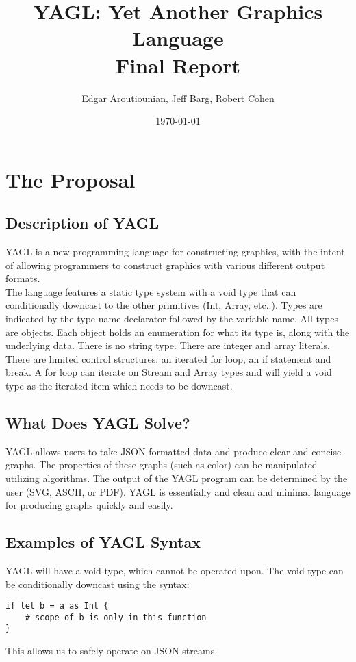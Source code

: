 \documentclass[12pt]{article}
\begin{document}
\title{YAGL: Yet Another Graphics Language\\Final Report}
\author{Edgar Aroutiounian, Jeff Barg, Robert Cohen}
\date{\today}
\maketitle


\section{The Proposal}
\subsection{Description of YAGL}
YAGL is a new programming language for constructing graphics, with the intent of allowing programmers to construct graphics with various different output formats.\\

The language features a static type system with a void type that can conditionally downcast to the other primitives (Int, Array, etc..).  Types are indicated by the type name declarator followed by the variable name.  All types are objects.  Each object holds an enumeration for what its type is, along with the underlying data.  There is no string type.  There are integer and array literals.\\

There are limited control structures: an iterated for loop, an if statement and break.  A for loop can iterate on Stream and Array types and will yield a void type as the iterated item which needs to be downcast.

\subsection{What Does YAGL Solve?}
YAGL allows users to take JSON formatted data and produce clear and concise graphs. The properties of these graphs (such as color) can be manipulated utilizing algorithms. The output of the YAGL program can be determined by the user (SVG, ASCII, or PDF). YAGL is essentially and clean and minimal language for producing graphs quickly and easily.

\subsection{Examples of YAGL Syntax}
YAGL will have a void type, which cannot be operated upon. The void type can be conditionally downcast using the syntax:
\begin{lstlisting}
if let b = a as Int {
	# scope of b is only in this function 
}
\end{lstlisting}
This allows us to safely operate on JSON streams.\\
\end{document}
